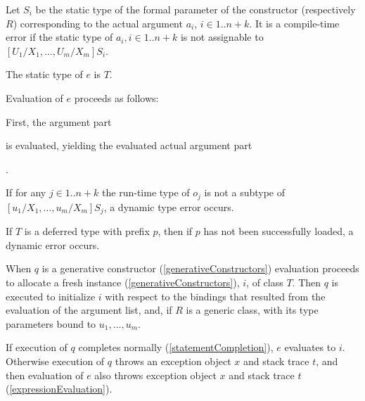 \documentclass[makeidx]{article}
\begin{document}
{\LMHash{}%
Let $S_i$ be the static type of
the formal parameter of the constructor  (respectively $R$)
corresponding to the actual argument $a_i$, $i \in 1 .. n+k$.
It is a compile-time error if the static type of
$a_i, i \in 1 .. n + k$
is not assignable to $[U_1/X_1, \ldots, U_m/X_m]S_i$.

\LMHash{}%
The static type of $e$ is $T$.

\LMHash{}%
Evaluation of $e$ proceeds as follows:

\LMHash{}%
First, the argument part


\noindent
is evaluated, yielding the evaluated actual argument part

.

\noindent
{}
If for any
$j \in 1 .. n + k$
the run-time type of $o_j$ is not a subtype of
$[u_1/X_1, \ldots, u_m/X_m]S_j$,
a dynamic type error occurs.

\LMHash{}%
If $T$ is a deferred type with prefix $p$,
then if $p$ has not been successfully loaded,
a dynamic error occurs.
\EndCase

\LMHash{}%
When $q$ is a generative constructor
(\ref{generativeConstructors})
evaluation proceeds to allocate a fresh instance
(\ref{generativeConstructors}), $i$, of class $T$.
Then $q$ is executed to initialize $i$ with respect to
the bindings that resulted from the evaluation of the argument list, and,
if $R$ is a generic class,
with its type parameters bound to $u_1, \ldots, u_m$.

\LMHash{}%
If execution of $q$ completes normally (\ref{statementCompletion}), $e$ evaluates to $i$.
Otherwise execution of $q$ throws an exception object $x$ and stack trace $t$,
and then evaluation of $e$ also throws exception object $x$ and stack trace $t$
(\ref{expressionEvaluation}).
\EndCase

}
\end{document}
